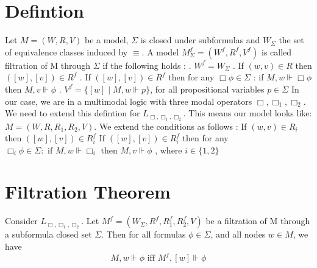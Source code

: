 \documentclass[12pt, a4paper]{scrreprt}
\begin{document}
\section{Defintion}

Let $M = (W,R,V)$ be a model, $\Sigma$ is closed under subformulas and $W_\Sigma$ the set of equivalence classes induced by $\equiv$.
A model $M^f_\Sigma = (W^f, R^f, V^f)$ is called filtration of M through $\Sigma$ if the following holds : \newline {}. $W^f = W_\Sigma$ . If $(w,v) \in R$ then $([w],[v]) \in R^f$ . If $([w], [v]) \in R^f$ then for any $\Box \phi \in \Sigma$ : if $M,w \Vdash \Box \phi$ then $M,v \Vdash \phi$  . $V^f = \{[w] \mid M,w \Vdash p\}$, for all propositional variables $p \in \Sigma$  
\newline \newline
In our case, we are in a multimodal logic with three modal operators $\Box, \Box_1,\Box_2$. We need to extend this defintion for  $L_{\Box,\Box_1,\Box_2}$. This means our model looks like:
$M = (W, R,R_1, R_2,V)$. We extend the conditions as follows : \newline \newline
If $ (w,v) \in R_i$ then $([w], [v]) \in R^f_i$ \newline
If $ ([w], [v]) \in R^f_i$ then for any $\Box_i \phi \in \Sigma : \mbox{ if } M,w \Vdash \Box_i$ then $M,v \Vdash \phi$ ,  where $i \in \{1,2\}$

\section{Filtration Theorem}
Consider $L_{\Box, \Box_1, \Box_2}$. Let $M^f =(W_\Sigma, R^f, R^f_1, R^f_2, V)$ be a filtration of M through a subformula closed set $\Sigma$.
Then for all formulas $\phi \in \Sigma$, and all nodes $w \in M$, we have $$M,w \Vdash \phi \mbox{ iff } M^f,[w] \Vdash \phi$$
\end{document}
